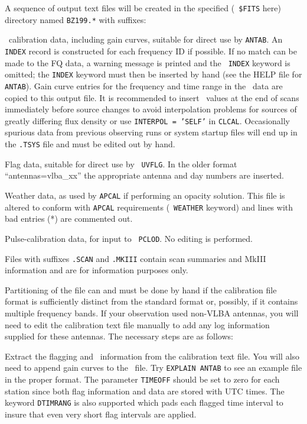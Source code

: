 A sequence of output text files will be created in the specified ({\tt
\$FITS} here) directory named {\tt BZ199.*} with suffixes:

\xben
{} \Tsys\ calibration data, including gain
curves, suitable for direct use by {\tt ANTAB}\@.  An {\tt INDEX}
record is constructed for each frequency ID if possible. If no match
can be made to the FQ data, a warning message is printed and the {\tt
INDEX} keyword is omitted; the {\tt INDEX} keyword must then be
inserted by hand (see the HELP file for {\tt ANTAB}).  Gain curve
entries for the frequency and time range in the \uv\ data are copied
to this output file.  It is recommended to insert \Tsys\ values
at the end of scans immediately before source changes to avoid
interpolation problems for sources of greatly differing flux density
or use {\tt INTERPOL = 'SELF'} in {\tt CLCAL}\@.  Occasionally
spurious data from previous observing runs or system startup files
will end up in the {\tt .TSYS} file and must be edited out by hand.

 Flag data, suitable for direct use by {\tt
UVFLG}\@. In the older format ``antennas=vlba\_xx'' the appropriate
antenna and day numbers are inserted.

 Weather data, as used by {\tt APCAL} if performing an
opacity solution. This file is altered to conform with {\tt APCAL}
requirements (\eg\ {\tt WEATHER} keyword) and lines with bad entries
(*) are commented out.

 Pulse-calibration data, for input to {\tt
PCLOD}\@. No editing is performed.
\xeen

Files with suffixes {\tt .SCAN} and {\tt .MKIII} contain scan
summaries and MkIII information and are for information purposes only.


Partitioning of the  file can and must be done by
hand if the calibration file format is sufficiently distinct from the
standard  format or, possibly, if it contains multiple
frequency bands.  If your observation used non-VLBA antennas, you will
need to edit the calibration text file manually to add any log
information supplied for these antennas.  The necessary steps are as
follows:

Extract the flagging and \Tsys\  information from the
calibration text file.  You will also need to append gain curves to
the \Tsys\ file.  Try {\tt EXPLAIN ANTAB} to see an example
file in the proper format.  The parameter {\tt TIMEOFF} should be set
to zero for each station since both flag information and data are
stored with UTC times.  The keyword {\tt DTIMRANG} is also supported
which pads each flagged time interval to insure that even very short
flag intervals are applied.

